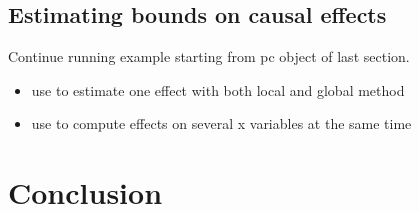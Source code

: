\documentclass[article]{jss}
\begin{document}
\subsection{Estimating bounds on causal effects}
Continue running example starting from pc object of last section.
\begin{itemize}
\item use  to estimate one effect with both local and global method
\item use  to compute effects on several x variables at the same time
\end{itemize}
\section{Conclusion}
\end{document}
